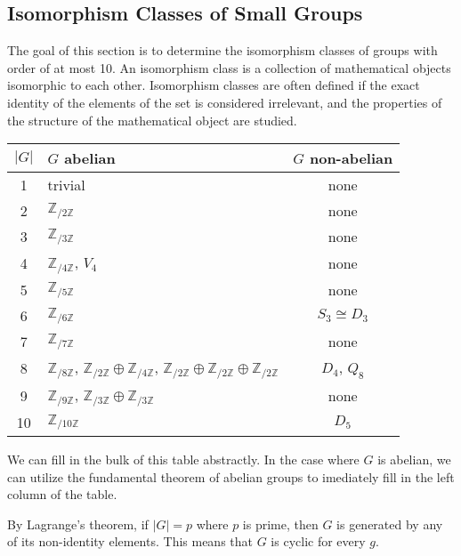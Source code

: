 \subsection{Isomorphism Classes of Small Groups}
The goal of this section is to determine the isomorphism classes of groups with order of at most 10.
An isomorphism class is a collection of mathematical objects isomorphic to each other.
Isomorphism classes are often defined if the exact identity of the elements of the set is considered irrelevant, and the properties of the structure of the mathematical object are studied.

\begin{center}
   \begin{tabular}{|c|l|c|}
      \(|G|\) & \(G\) abelian & \(G\) non-abelian \\
      \hline
      1 & trivial                                & none\\
      2 & \(\mathbb{Z}_{/2\mathbb{Z}}\)          & none \\
      3 & \(\mathbb{Z}_{/3\mathbb{Z}}\)          & none \\
      4 & \(\mathbb{Z}_{/4\mathbb{Z}}\), \(V_4\) & none \\
      5 & \(\mathbb{Z}_{/5\mathbb{Z}}\)          & none \\
      \hline
      6  & \(\mathbb{Z}_{/6\mathbb{Z}}\)         & \(S_3 \cong D_3\) \\
      7  & \(\mathbb{Z}_{/7\mathbb{Z}}\)         & none \\
      8  & \(\mathbb{Z}_{/8\mathbb{Z}}\), \(\mathbb{Z}_{/2\mathbb{Z}} \oplus \mathbb{Z}_{/4\mathbb{Z}}\), \(\mathbb{Z}_{/2\mathbb{Z}} \oplus \mathbb{Z}_{/2\mathbb{Z}} \oplus \mathbb{Z}_{/2\mathbb{Z}}\)           & \(D_4\), \(Q_8\) \\
      9  & \(\mathbb{Z}_{/9\mathbb{Z}}\), \(\mathbb{Z}_{/3\mathbb{Z}} \oplus \mathbb{Z}_{/3\mathbb{Z}}\) & none \\
      10 & \(\mathbb{Z}_{/10\mathbb{Z}}\)        & \(D_5\) \\
   \end{tabular}
\end{center}

We can fill in the bulk of this table abstractly.
In the case where \(G\) is abelian, we can utilize the fundamental theorem of abelian groups to imediately fill in the left column of the table.

By Lagrange's theorem, if \(|G| = p\) where \(p\) is prime, then \(G\) is generated by any of its non-identity elements.
This means that \(G\) is cyclic for every \(g\).

